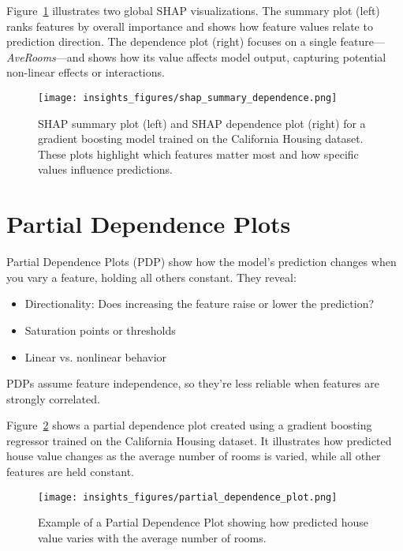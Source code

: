 \documentclass[12pt,openany]{book}
\begin{document}
Figure~\ref{fig:shap-summary-dependence} illustrates two global SHAP visualizations. The summary plot (left) ranks features by overall importance and shows how feature values relate to prediction direction. The dependence plot (right) focuses on a single feature—\textit{AveRooms}—and shows how its value affects model output, capturing potential non-linear effects or interactions.

\begin{figure}[H]
    \centering
    \texttt{[image: insights\_figures/shap\_summary\_dependence.png]}
    \caption{SHAP summary plot (left) and SHAP dependence plot (right) for a gradient boosting model trained on the California Housing dataset. These plots highlight which features matter most and how specific values influence predictions.}
    \label{fig:shap-summary-dependence}
\end{figure}



\section{Partial Dependence Plots }

Partial Dependence Plots (PDP) show how the model's prediction changes when you vary a feature, holding all others constant. They reveal:
\begin{itemize}
  \item Directionality: Does increasing the feature raise or lower the prediction?
  \item Saturation points or thresholds
  \item Linear vs. nonlinear behavior
\end{itemize}

\begin{notebox}
PDPs assume feature independence, so they're less reliable when features are strongly correlated.
\end{notebox}

Figure~\ref{fig:partial-dependence} shows a partial dependence plot created using a gradient boosting regressor trained on the California Housing dataset. It illustrates how predicted house value changes as the average number of rooms is varied, while all other features are held constant.


\begin{figure}[H]
    \centering
    \texttt{[image: insights\_figures/partial\_dependence\_plot.png]}
    \caption{Example of a Partial Dependence Plot showing how predicted house value varies with the average number of rooms.}
    \label{fig:partial-dependence}
\end{figure}
\end{document}
